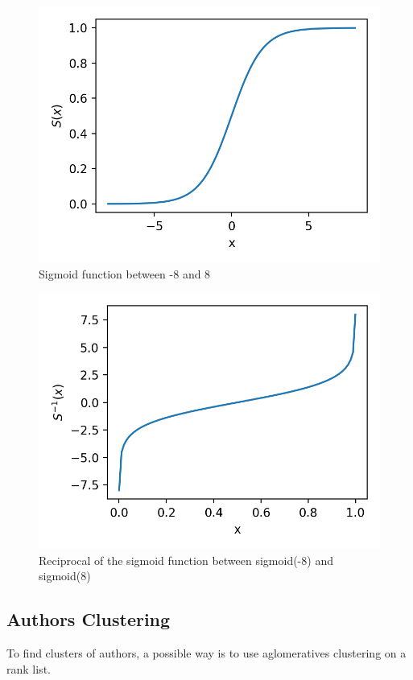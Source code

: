 \begin{figure}
  \includegraphics[width=\linewidth]{img/sigmoid.png}
  \caption{Sigmoid function between -8 and 8}
  \label{fig:sigmoid}
\end{figure}
\begin{figure}
  \includegraphics[width=\linewidth]{img/sigmoid_reciprocal.png}
  \caption{Reciprocal of the sigmoid function between sigmoid(-8) and sigmoid(8)}
  \label{fig:sigmoid_reciprocal}
\end{figure}

\subsection{Authors Clustering}

To find clusters of authors, a possible way is to use aglomeratives clustering on a rank list.
